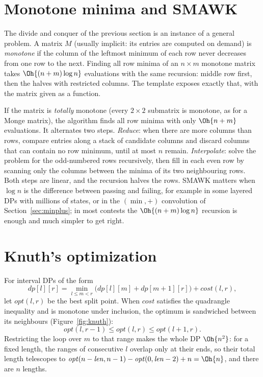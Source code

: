 \section[Monotone minima and SMAWK]{Monotone minima and SMAWK \hfill \ioi}\label{sec:smawk}

The divide and conquer of the previous section is an instance of a general problem. A matrix $M$ (usually implicit: its entries are
computed on demand) is \emph{monotone} if the column of the leftmost minimum of each row never decreases from one row to the next.
Finding all row minima of an $n \times m$ monotone matrix takes $\Oh{(n + m) \log n}$ evaluations with the same recursion:
middle row first, then the halves with restricted columns. The template exposes exactly that, with the matrix given as a function.


If the matrix is \emph{totally} monotone (every $2 \times 2$ submatrix is monotone, as for a Monge matrix), the  algorithm
finds all row minima with only $\Oh{n + m}$ evaluations. It alternates two steps. \emph{Reduce}: when there are more columns than
rows, compare entries along a stack of candidate columns and discard columns that can contain no row minimum, until at most $n$
remain. \emph{Interpolate}: solve the problem for the odd-numbered rows recursively, then fill in each even row by scanning only the
columns between the minima of its two neighbouring rows. Both steps are linear, and the recursion halves the rows. SMAWK matters when
$\log n$ is the difference between passing and failing, for example in some layered DPs with millions of states, or in the
$(\min, +)$ convolution of Section~\ref{sec:minplus}; in most contests the $\Oh{(n + m) \log n}$ recursion is enough and much simpler to
get right.

\section[Knuth's optimization]{Knuth's optimization \hfill \plat}\label{sec:knuth}

For interval DPs of the form
\[ dp[l][r] = \min_{l \le m < r} \bigl(dp[l][m] + dp[m+1][r]\bigr) + \mathit{cost}(l, r), \]
let $\mathit{opt}(l, r)$ be the best split point. When $\mathit{cost}$ satisfies the quadrangle inequality and is monotone under
inclusion, the optimum is sandwiched between its neighbours (Figure~\ref{fig:knuth}):
\[ \mathit{opt}(l, r - 1) \le \mathit{opt}(l, r) \le \mathit{opt}(l + 1, r). \]
Restricting the loop over $m$ to that range makes the whole DP $\Oh{n^2}$: for a fixed length, the ranges of consecutive $l$ overlap
only at their ends, so their total length telescopes to $\mathit{opt}(n - \mathit{len}, n - 1) - \mathit{opt}(0, \mathit{len} - 2) + n
= \Oh{n}$, and there are $n$ lengths.

